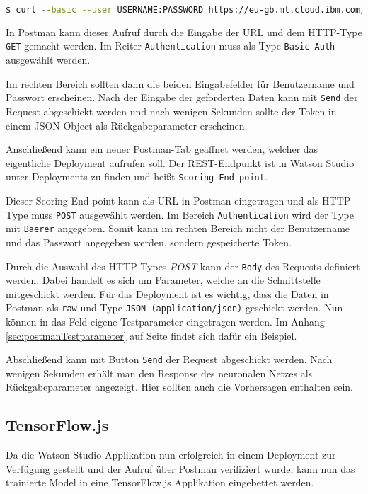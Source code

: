 \begin{lstlisting}[language=bash, caption=Abruf des Auth-Tokens, label=Abruf des Auth-Tokens]
$ curl --basic --user USERNAME:PASSWORD https://eu-gb.ml.cloud.ibm.com/v3/identity/token
\end{lstlisting}

In Postman kann dieser Aufruf durch die Eingabe der URL und dem HTTP-Type \texttt{GET} gemacht werden. Im Reiter
\texttt{Authentication} muss als Type \texttt{Basic-Auth} ausgewählt werden.

Im rechten Bereich sollten dann die beiden Eingabefelder für Benutzername und Passwort erscheinen. Nach der Eingabe der
geforderten Daten kann mit \texttt{Send} der Request abgeschickt werden und nach wenigen Sekunden sollte der Token in
einem JSON-Object als Rückgabeparameter erscheinen.

Anschließend kann ein neuer Postman-Tab geäffnet werden, welcher das eigentliche Deployment aufrufen soll. Der
REST-Endpunkt ist in Watson Studio unter Deployments zu finden und heißt \texttt{Scoring End-point}.

Dieser Scoring End-point kann als URL in Postman eingetragen und als HTTP-Type muss \texttt{POST} ausgewählt werden. Im
Bereich \texttt{Authentication} wird der Type mit \texttt{Baerer} angegeben. Somit kann im rechten Bereich nicht der
Benutzername und das Passwort angegeben werden, sondern gespeicherte Token.

Durch die Auswahl des HTTP-Types \textit{POST} kann der \texttt{Body} des Requests definiert werden. Dabei handelt es
sich um Parameter, welche an die Schnittstelle mitgeschickt werden. Für das Deployment ist es wichtig, dass die Daten
in Postman als \texttt{raw} und Type \texttt{JSON (application/json)} geschickt werden. Nun können in das Feld eigene
Testparameter eingetragen werden. Im Anhang \ref{sec:postmanTestparameter} auf Seite \pageref{sec:postmanTestparameter}
findet sich dafür ein Beispiel.

Abschließend kann mit Button \texttt{Send} der Request abgeschickt werden. Nach wenigen Sekunden erhält man den Response
des neuronalen Netzes als Rückgabeparameter angezeigt. Hier sollten auch die Vorhersagen enthalten sein.

\subsection{TensorFlow.js}
Da die Watson Studio Applikation nun erfolgreich in einem Deployment zur Verfügung gestellt und der Aufruf über
Postman verifiziert wurde, kann nun das trainierte Model in eine TensorFlow.js Applikation eingebettet werden.

